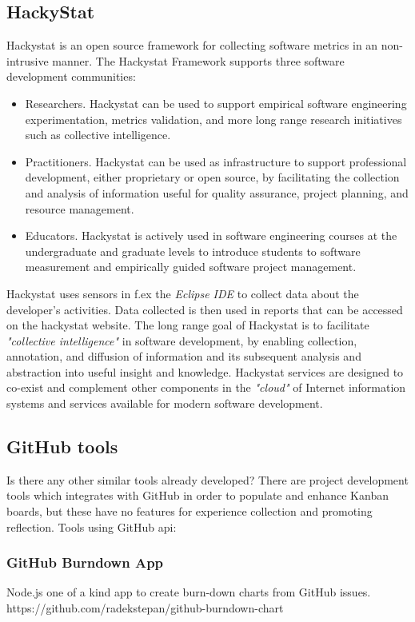 \subsection{HackyStat}
Hackystat is an open source framework for collecting software metrics in an non-intrusive manner. 
The Hackystat Framework supports three software development communities:
\begin{itemize}
	\item Researchers. Hackystat can be used to support empirical software engineering experimentation, metrics validation, and more long range research initiatives such as collective intelligence.
	\item Practitioners. Hackystat can be used as infrastructure to support professional development, either proprietary or open source, by facilitating the collection and analysis of information useful for quality assurance, project planning, and resource management.
	\item Educators. Hackystat is actively used in software engineering courses at the undergraduate and graduate levels to introduce students to software measurement and empirically guided software project management.
\end{itemize}
Hackystat uses sensors in f.ex the \emph{Eclipse IDE} to collect data about the developer's activities. Data collected is then used in reports that can be accessed on the hackystat website. 
The long range goal of Hackystat is to facilitate \emph{"collective intelligence"} in software development, by enabling collection, annotation, and diffusion of information and its subsequent analysis and abstraction into useful insight and knowledge. Hackystat services are designed to co-exist and complement other components in the \emph{"cloud"} of Internet information systems and services available for modern software development.\\ 

\subsection{GitHub tools}
Is there any other similar tools already developed? There are project development tools which integrates with GitHub in order to populate and enhance Kanban boards, but these have no features for experience collection and promoting reflection. 
Tools using GitHub api: \\
\subsubsection{GitHub Burndown App}
Node.js one of a kind app to create burn-down charts from GitHub issues. 
https://github.com/radekstepan/github-burndown-chart
